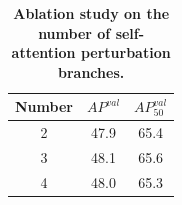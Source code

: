 \documentclass[10pt,twocolumn,letterpaper]{article}
\begin{document}
\begin{table}[]
\centering
\renewcommand{\arraystretch}{1.2}
\begin{tabular}{c|cc}
\hline
Number & $AP^{val}$ & $AP^{val}_{50}$ \\ \hline
2      & 47.9 & 65.4      \\
3      & 48.1 & 65.6      \\
4      & 48.0 & 65.3      \\ \hline
\end{tabular}
\caption{\textbf{Ablation study on the number of self-attention perturbation branches.}}
\label{Ablation_number}
\end{table}




\end{document}

